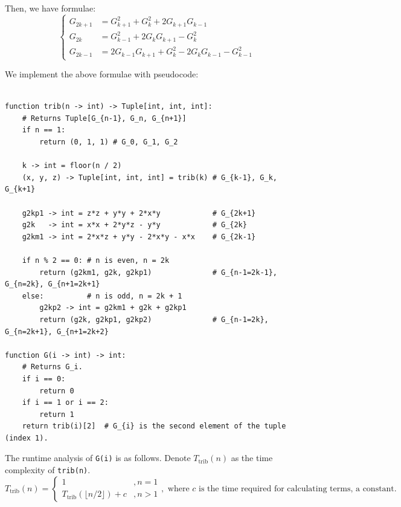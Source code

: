 \documentclass[answers]{exam}
\begin{document}
\begin{questions}
\begin{parts}
\begin{subparts}
\begin{solution}
                Then, we have formulae:
                \[
                    \begin{cases}
                        G_{2k+1} &= G_{k+1}^2 + G_k^2 + 2G_{k+1}G_{k-1}\\
                        G_{2k} &= G_{k-1}^2 + 2G_kG_{k+1} - G_k^2\\
                        G_{2k-1} &= 2G_{k-1}G_{k+1} + G_k^2 - 2G_kG_{k-1} - G_{k-1}^2
                    \end{cases}
                \]

                We implement the above formulae with pseudocode:

                \begin{verbatim}
                    
function trib(n -> int) -> Tuple[int, int, int]:
    # Returns Tuple[G_{n-1}, G_n, G_{n+1}]
    if n == 1:
        return (0, 1, 1) # G_0, G_1, G_2

    k -> int = floor(n / 2)
    (x, y, z) -> Tuple[int, int, int] = trib(k) # G_{k-1}, G_k, G_{k+1}

    g2kp1 -> int = z*z + y*y + 2*x*y            # G_{2k+1}
    g2k   -> int = x*x + 2*y*z - y*y            # G_{2k}
    g2km1 -> int = 2*x*z + y*y - 2*x*y - x*x    # G_{2k-1}

    if n % 2 == 0: # n is even, n = 2k
        return (g2km1, g2k, g2kp1)              # G_{n-1=2k-1}, G_{n=2k}, G_{n+1=2k+1}
    else:          # n is odd, n = 2k + 1
        g2kp2 -> int = g2km1 + g2k + g2kp1
        return (g2k, g2kp1, g2kp2)              # G_{n-1=2k}, G_{n=2k+1}, G_{n+1=2k+2}

function G(i -> int) -> int:
    # Returns G_i.
    if i == 0:
        return 0
    if i == 1 or i == 2:
        return 1
    return trib(i)[2]  # G_{i} is the second element of the tuple (index 1).

                \end{verbatim}
    
                The runtime analysis of \texttt{G(i)} is as follows.
                Denote $T_{\text{trib}}(n)$ as the time complexity of \texttt{trib(n)}.
                \[
                    T_{\text{trib}}(n)=\begin{cases}
                        1 & ,n=1\\
                        T_{\text{trib}}(\lfloor n/2 \rfloor) + c & ,n>1
                    \end{cases},\text{ where }c\text{ is the time required for calculating terms, a constant}.
                \]


\end{solution}
\end{subparts}
\end{parts}
\end{questions}
\end{document}
